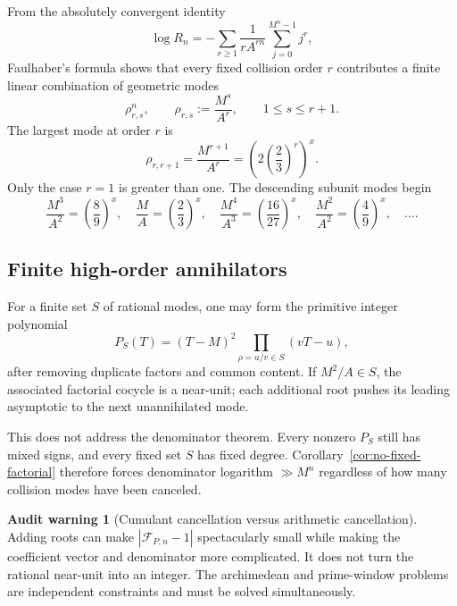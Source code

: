 \documentclass[11pt,oneside]{article}
\theoremstyle{definition}
\newtheorem{warning}[theorem]{Audit warning}
\theoremstyle{remark}
\newcommand{\cF}{\mathcal F}
\begin{document}
From the absolutely convergent identity
\begin{equation}
 \log R_n=-\sum_{r\ge1}\frac1{rA^{rn}}
              \sum_{j=0}^{M^n-1}j^r,
 \label{eq:full-log-series}
\end{equation}
Faulhaber's formula shows that every fixed collision order $r$ contributes a finite linear
combination of geometric modes
\begin{equation}
 \rho_{r,s}^n,
 \qquad
 \rho_{r,s}:=\frac{M^s}{A^r},
 \qquad 1\le s\le r+1.
 \label{eq:mode-lattice}
\end{equation}
The largest mode at order $r$ is
\begin{equation}
 \rho_{r,r+1}=\frac{M^{r+1}}{A^r}
 =\left(2\left(\frac23\right)^r\right)^x.
 \label{eq:leading-r-mode}
\end{equation}
Only the case $r=1$ is greater than one.  The descending subunit modes begin
\begin{equation}
 \frac{M^3}{A^2}=\left(\frac89\right)^x,
 \quad
 \frac MA=\left(\frac23\right)^x,
 \quad
 \frac{M^4}{A^3}=\left(\frac{16}{27}\right)^x,
 \quad
 \frac{M^2}{A^2}=\left(\frac49\right)^x,
 \quad\ldots.
 \label{eq:mode-order}
\end{equation}

\subsection{Finite high-order annihilators}

For a finite set $S$ of rational modes, one may form the primitive integer polynomial
\begin{equation}
 P_S(T)=(T-M)^2\prod_{\rho=u/v\in S}(vT-u),
 \label{eq:PS}
\end{equation}
after removing duplicate factors and common content.  If $M^2/A\in S$, the associated
factorial cocycle is a near-unit; each additional root pushes its leading asymptotic to the
next unannihilated mode.

This does not address the denominator theorem.  Every nonzero $P_S$ still has mixed signs,
and every fixed set $S$ has fixed degree.  Corollary~\ref{cor:no-fixed-factorial} therefore
forces denominator logarithm $\gg M^n$ regardless of how many collision modes have been
canceled.

\begin{warning}[Cumulant cancellation versus arithmetic cancellation]
\label{warn:cumulant-arithmetic}
Adding roots can make $|\cF_{P,n}-1|$ spectacularly small while making the coefficient vector
and denominator more complicated.  It does not turn the rational near-unit into an integer.
The archimedean and prime-window problems are independent constraints and must be solved
simultaneously.
\end{warning}
\end{document}
